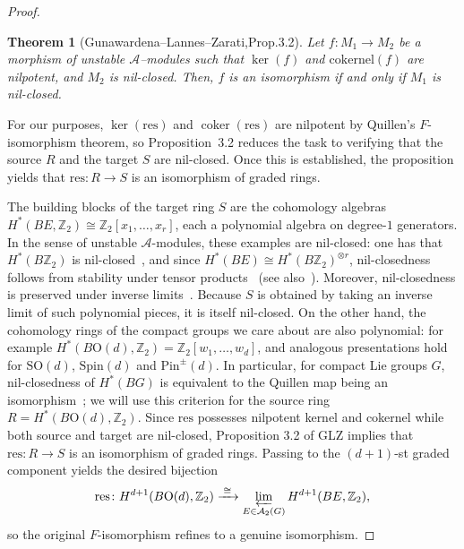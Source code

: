 \documentclass[aps,prx,reprint,superscriptaddress,twocolumn,amsmath,amssymb,amsfonts, nofootinbib]{revtex4-2}
\newcommand{\SO}{\text{SO}}
\newcommand{\qa}{\mathcal{A}_{2}}
\newcommand{\res}{\text{res}}
\theoremstyle{apsstyle}
\newtheorem{theorem}{Theorem}[section]
\begin{document}
\begin{proof}
\medskip


\begin{theorem}[Gunawardena–Lannes–Zarati,Prop.3.2\cite{GLZ}]
\label{prop:glz}
Let $f\colon M_{1}\to M_{2}$ be a morphism of unstable
$\mathcal{A}$–modules such that $\ker(f)$ and $\mathrm{cokernel}(f)$ are nilpotent, and $M_{2}$ is nil-closed. Then, $f$ is an isomorphism if and only if $M_{1}$ is nil-closed.
\end{theorem}

\medskip

\noindent For our purposes, $\ker (\res)$ and $\operatorname{coker}(\res)$ are nilpotent by Quillen’s $F$-isomorphism theorem, so Proposition~3.2 reduces the task to verifying that the source $R$ and the target $S$ are nil-closed. Once this is established, the proposition yields that $\res\colon R\to S$ is an isomorphism of graded rings.

\bigskip

The building blocks of the target ring $S$ are the cohomology algebras $H^{*}(BE,\mathbb Z_{2})\cong\mathbb Z_{2}[x_{1},\dots ,x_{r}]$, each a polynomial algebra on degree-$1$ generators.  In the sense of unstable $\mathcal A$-modules, these examples are nil-closed: one has that $H^{*}(B\mathbb Z_2)$ is nil-closed~\cite[Lem.~4.1]{GLZ}, and since
$H^{*}(BE)\cong H^{*}(B\mathbb Z_2)^{\otimes r}$, nil-closedness follows from stability under tensor products~\cite[Prop.~3.4]{GLZ} (see also~\cite[\S4.2]{GLZ}). Moreover, nil-closedness is preserved under inverse limits~\cite[\S4.3]{GLZ}. Because $S$ is obtained by taking an inverse limit of such polynomial pieces, it is itself nil-closed. On the other hand, the cohomology rings of the compact groups we care about are also polynomial: for example $H^{*}(B\mathrm{O}(d),\mathbb Z_{2})=\mathbb Z_{2}[w_{1},\dots ,w_{d}]$, and analogous presentations hold for $\SO(d)$, $\mathrm{Spin}(d)$ and $\mathrm{Pin}^{\pm}(d)$. In particular, for compact Lie groups $G$, nil-closedness of $H^{*}(BG)$ is equivalent to the Quillen map being an isomorphism~\cite[Prop.~4.5]{GLZ}; we will use this criterion for the source ring $R=H^{*}(B\mathrm{O}(d),\mathbb Z_{2})$. Since $\res$ possesses nilpotent kernel and cokernel while both source and target are nil-closed, Proposition 3.2 of GLZ implies that
$\res \colon R\to S$ is an isomorphism of graded rings.  Passing to the
$(d + 1)$-st graded component yields the desired bijection
\begin{equation}
\res\colon H^{d+1}(B\mathrm{O}(d),\mathbb Z_{2})\xrightarrow{\;\cong\;}
\varprojlim_{E\in \qa(G)}H^{d+1}(BE,\mathbb Z_{2}),
\label{eq:qisom_mod2}
\end{equation}
so the original $F$-isomorphism refines to a genuine isomorphism.
\end{proof}
\end{document}
